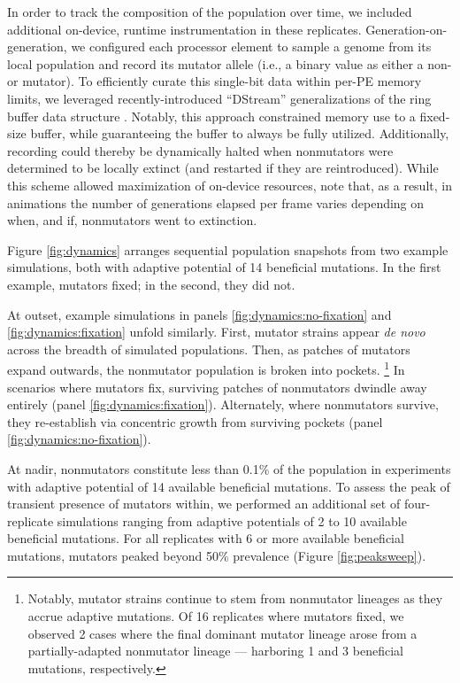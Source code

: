 In order to track the composition of the population over time, we included additional on-device, runtime instrumentation in these replicates.
Generation-on-generation, we configured each processor element to sample a genome from its local population and record its mutator allele (i.e., a binary value as either a non- or mutator).
To efficiently curate this single-bit data within per-PE memory limits, we leveraged recently-introduced ``DStream'' generalizations of the ring buffer data structure \citep{moreno2024algorithms}.
Notably, this approach constrained memory use to a fixed-size buffer, while guaranteeing the buffer to always be fully utilized.
Additionally, recording could thereby be dynamically halted when nonmutators were determined to be locally extinct (and restarted if they are reintroduced).
While this scheme allowed maximization of on-device resources, note that, as a result, in animations the number of generations elapsed per frame varies depending on when, and if, nonmutators went to extinction.



Figure \ref{fig:dynamics} arranges sequential population snapshots from two example simulations, both with adaptive potential of 14 beneficial mutations.
In the first example, mutators fixed; in the second, they did not.

At outset, example simulations in panels \ref{fig:dynamics:no-fixation} and \ref{fig:dynamics:fixation} unfold similarly.
First, mutator strains appear \textit{de novo} across the breadth of simulated populations.
Then, as patches of mutators expand outwards, the nonmutator population is broken into pockets.%
\footnote{%
Notably, mutator strains continue to stem from nonmutator lineages as they accrue adaptive mutations.
Of 16 replicates where mutators fixed, we observed 2 cases where the final dominant mutator lineage arose from a partially-adapted nonmutator lineage --- harboring 1 and 3 beneficial mutations, respectively.
}
In scenarios where mutators fix, surviving patches of nonmutators dwindle away entirely (panel \ref{fig:dynamics:fixation}).
Alternately, where nonmutators survive, they re-establish via concentric growth from surviving pockets (panel \ref{fig:dynamics:no-fixation}).



At nadir, nonmutators constitute less than 0.1\% of the population in experiments with adaptive potential of 14 available beneficial mutations.
To assess the peak of transient presence of mutators within, we performed an additional set of four-replicate simulations ranging from adaptive potentials of 2 to 10 available beneficial mutations.
For all replicates with 6 or more available beneficial mutations, mutators peaked beyond 50\% prevalence (Figure \ref{fig:peaksweep}).
